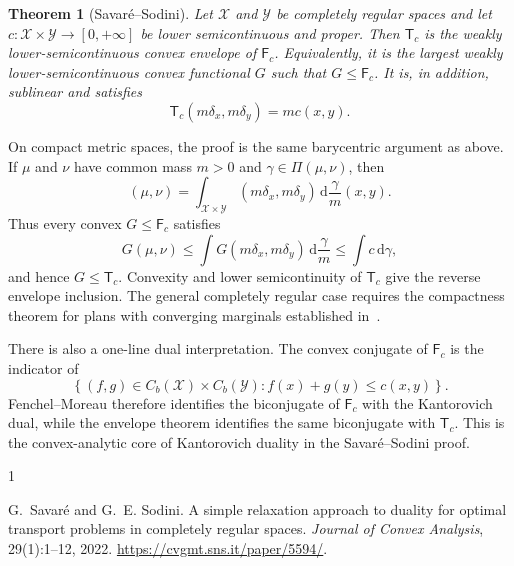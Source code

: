 \documentclass[11pt]{article}
\newtheorem{theorem}{Theorem}[section]
\theoremstyle{definition}
\theoremstyle{remark}
\newcommand{\PiC}{\Pi}
\newcommand{\dd}{\,\mathrm d}
\begin{document}
\begin{theorem}[Savar\'e--Sodini]
Let $\mathcal X$ and $\mathcal Y$ be completely regular spaces and let
$c:\mathcal X\times\mathcal Y\to[0,+\infty]$ be lower semicontinuous and
proper. Then $\mathsf T_c$ is the weakly lower-semicontinuous convex envelope
of $\mathsf F_c$. Equivalently, it is the largest weakly lower-semicontinuous
convex functional $G$ such that $G\leq\mathsf F_c$. It is, in addition,
sublinear and satisfies
\[
  \mathsf T_c(m\delta_x,m\delta_y)=m c(x,y).
\]
\end{theorem}

On compact metric spaces, the proof is the same barycentric argument as
above. If $\mu$ and $\nu$ have common mass $m>0$ and
$\gamma\in\PiC(\mu,\nu)$, then
\[
  (\mu,\nu)
  =\int_{\mathcal X\times\mathcal Y}
  (m\delta_x,m\delta_y)\dd\frac{\gamma}{m}(x,y).
\]
Thus every convex $G\leq\mathsf F_c$ satisfies
\[
  G(\mu,\nu)
  \leq\int G(m\delta_x,m\delta_y)\dd\frac{\gamma}{m}
  \leq\int c\dd\gamma,
\]
and hence $G\leq\mathsf T_c$. Convexity and lower semicontinuity of
$\mathsf T_c$ give the reverse envelope inclusion. The general completely
regular case requires the compactness theorem for plans with converging
marginals established in~\cite{SavareSodini2022}.

There is also a one-line dual interpretation. The convex conjugate of
$\mathsf F_c$ is the indicator of
\[
  \left\{(f,g)\in C_b(\mathcal X)\times C_b(\mathcal Y):
  f(x)+g(y)\leq c(x,y)\right\}.
\]
Fenchel--Moreau therefore identifies the biconjugate of $\mathsf F_c$ with
the Kantorovich dual, while the envelope theorem identifies the same
biconjugate with $\mathsf T_c$. This is the convex-analytic core of
Kantorovich duality in the Savar\'e--Sodini proof.

\begin{thebibliography}{1}

G.~Savar\'e and G.~E. Sodini.
\newblock A simple relaxation approach to duality for optimal transport
  problems in completely regular spaces.
\newblock \emph{Journal of Convex Analysis}, 29(1):1--12, 2022.
\newblock \url{https://cvgmt.sns.it/paper/5594/}.

\end{thebibliography}
\end{document}
